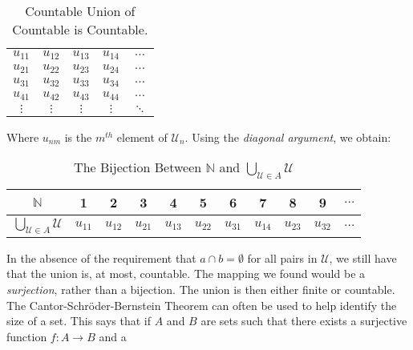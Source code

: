         \begin{table}[H]
            \captionsetup{type=table}
            \centering
            \begin{tabular}{ccccc}
                $u_{11}$&$u_{12}$&$u_{13}$
                &$u_{14}$&$\hdots$\\
                $u_{21}$&$u_{22}$&$u_{23}$
                &$u_{24}$&$\hdots$\\
                $u_{31}$&$u_{32}$&$u_{33}$
                &$u_{34}$&$\hdots$\\
                $u_{41}$&$u_{42}$&$u_{43}$
                &$u_{44}$&$\hdots$\\
                $\vdots$&$\vdots$&$\vdots$
                &$\vdots$&$\ddots$
            \end{tabular}
            \caption{Countable Union of Countable is Countable.}
            \label{table:Func_Countable_Union_of_Countable}
        \end{table}
        Where $u_{nm}$ is the $m^{th}$ element of
        $\mathcal{U}_{n}$.
        Using the \textit{diagonal argument},
        we obtain:
        \begin{table}[H]
            \captionsetup{type=table}
            \centering
            \begin{tabular}{|c|c|c|c|c|c|c|c|c|c|c|}
                \hline
                $\mathbb{N}$&1&2&3&4&5&6&7&8&9&$\hdots$\\
                \hline
                $\bigcup_{\mathcal{U}\in{A}}\mathcal{U}$&
                $u_{11}$&$u_{12}$&$u_{21}$&$u_{13}$&
                $u_{22}$&$u_{31}$&$u_{14}$&$u_{23}$&
                $u_{32}$&$\hdots$\\
                \hline
            \end{tabular}
            \caption{The Bijection Between $\mathbb{N}$ and
                     $\bigcup_{\mathcal{U}\in{A}}\mathcal{U}$}
            \label{table:Func_Bijection_on_Countable_Union}
        \end{table}
        In the absence of the requirement that
        $a\cap{b}=\emptyset$ for all pairs in $\mathcal{U}$,
        we still have that the union is, at most, countable.
        The mapping we found would be a
        \textit{surjection}, rather than a bijection.
        The union is then either finite or countable. The
        Cantor-Schr\"{o}der-Bernstein Theorem can often be
        used to help identify the size of a set. This says
        that if $A$ and $B$ are sets such that there exists
        a surjective function $f:A\rightarrow{B}$ and a
